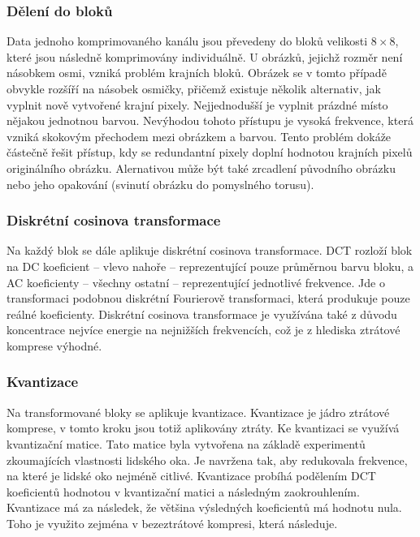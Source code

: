 \subsubsection*{Dělení do bloků}

Data jednoho komprimovaného kanálu jsou převedeny do bloků velikosti $8\times8$, které jsou následně komprimovány individuálně.
U obrázků, jejichž rozměr není násobkem osmi, vzniká problém krajních bloků.
Obrázek se v tomto případě obvykle rozšíří na násobek osmičky, přičemž existuje několik alternativ, jak vyplnit nově vytvořené krajní pixely.
Nejjednodušší je vyplnit prázdné místo nějakou jednotnou barvou.
Nevýhodou tohoto přístupu je vysoká frekvence, která vzniká skokovým přechodem mezi obrázkem a barvou.
Tento problém dokáže částečně řešit přístup, kdy se redundantní pixely doplní hodnotou krajních pixelů originálního obrázku.
Alernativou může být také zrcadlení původního obrázku nebo jeho opakování (svinutí obrázku do pomyslného torusu).

\subsubsection*{Diskrétní cosinova transformace}

Na každý blok se dále aplikuje diskrétní cosinova transformace.
DCT rozloží blok na DC koeficient -- vlevo nahoře -- reprezentující pouze průměrnou barvu bloku, a AC koeficienty -- všechny ostatní -- reprezentující jednotlivé frekvence.
Jde o transformaci podobnou diskrétní Fourierově transformaci, která produkuje pouze reálné koeficienty.
Diskrétní cosinova transformace je využívána také z důvodu koncentrace nejvíce energie na nejnižších frekvencích, což je z hlediska ztrátové komprese výhodné.

\subsubsection*{Kvantizace}

Na transformované bloky se aplikuje kvantizace.
Kvantizace je jádro ztrátové komprese, v tomto kroku jsou totiž aplikovány ztráty.
Ke kvantizaci se využívá kvantizační matice.
Tato matice byla vytvořena na základě experimentů zkoumajících vlastnosti lidského oka.
Je navržena tak, aby redukovala frekvence, na které je lidské oko nejméně citlivé.
Kvantizace probíhá podělením DCT koeficientů hodnotou v kvantizační matici a následným zaokrouhlením.
Kvantizace má za následek, že většina výsledných koeficientů má hodnotu nula.
Toho je využito zejména v bezeztrátové kompresi, která následuje.

